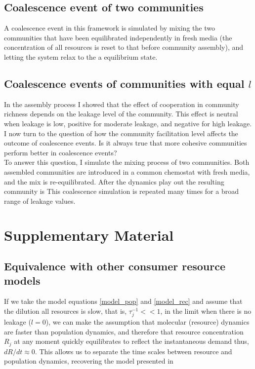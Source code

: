 \documentclass[12pt]{article}
\begin{document}
        \subsection{Coalescence event of two communities}\label{coalescence_event}
        
            A coalescence event in this framework is simulated by mixing the two communities that have been equilibrated independently in fresh media (the concentration of all resources is reset to that before community assembly), and letting the system relax to the a equilibrium state.\\
        
    	\subsection{Coalescence events of communities with equal $l$}
    	
    	    In the assembly process I showed that the effect of cooperation in community richness depends on the leakage level of the community. This effect is neutral when leakage is low, positive for moderate leakage, and negative for high leakage. I now turn to the question of how the community facilitation level affects the outcome of coalescence events. Is it always true that more cohesive communities perform better in coalescence events?\\
    	    To answer this question, I simulate the mixing process of two communities. Both assembled communities are introduced in a common chemostat with fresh media, and the mix is re-equilibrated. After the dynamics play out the resulting community is  This coalescence simulation is repeated many times for a broad range of leakage values. 
	
	\newpage
	
	\section{Supplementary Material}
	
	    \subsection{Equivalence with other consumer resource models}
	    
	        If we take the model equations \ref{model_pop} and \ref{model_rec} and assume that the dilution all resources is slow, that is, $ \tau_j^{-1} << 1$, in the limit when there is no leakage ($l = 0$), we can make the assumption that molecular (resource) dynamics are faster than population dynamics, and therefore that resource concentration $R_j$ at any moment quickly equilibrates to reflect the instantaneous demand thus, $ dR/dt \approx 0 $. This allows us to separate the time scales between resource and population dynamics, recovering the model presented in \cite{Tikhonov2016}\par
	        
\end{document}

